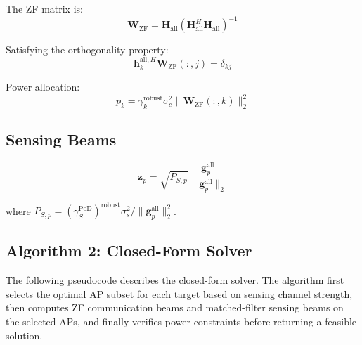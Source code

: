 \documentclass[12pt,a4paper]{article}
\newcommand{\vect}[1]{\mathbf{#1}}
\newcommand{\mat}[1]{\mathbf{#1}}
\newcommand{\norm}[1]{\|#1\|_2}
\begin{document}
The ZF matrix is:
\begin{equation}
\mat{W}_{\text{ZF}} = \mat{H}_{\text{all}} (\mat{H}_{\text{all}}^H \mat{H}_{\text{all}})^{-1} \tag{20}
\end{equation}

Satisfying the orthogonality property:
\begin{equation}
\vect{h}_k^{\text{all},H} \mat{W}_{\text{ZF}}(:,j) = \delta_{kj}
\end{equation}

Power allocation:
\begin{equation}
p_k = \gamma_k^{\text{robust}} \sigma_c^2 \norm{\mat{W}_{\text{ZF}}(:,k)}^2 \tag{21}
\end{equation}

\subsection{Sensing Beams}

\begin{equation}
\vect{z}_p = \sqrt{P_{S,p}} \frac{\vect{g}_p^{\text{all}}}{\norm{\vect{g}_p^{\text{all}}}} \tag{22}
\end{equation}

where $P_{S,p} = (\gamma_S^{\text{PoD}})^{\text{robust}} \sigma_s^2 / \norm{\vect{g}_p^{\text{all}}}^2$.

\subsection{Algorithm 2: Closed-Form Solver}

The following pseudocode describes the closed-form solver. The algorithm first selects the optimal AP subset for each target based on sensing channel strength, then computes ZF communication beams and matched-filter sensing beams on the selected APs, and finally verifies power constraints before returning a feasible solution.
\end{document}
